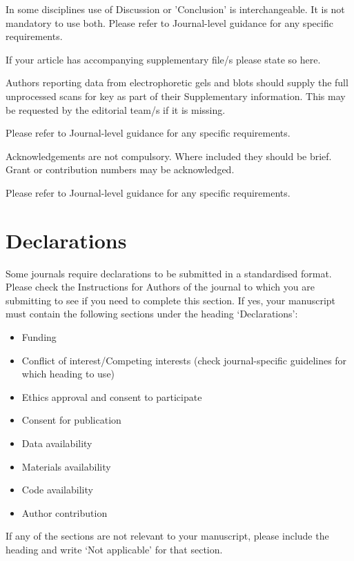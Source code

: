 \documentclass[pdflatex,sn-mathphys-num]{sn-jnl}%
\theoremstyle{thmstyleone}%
\theoremstyle{thmstyletwo}%
\theoremstyle{thmstylethree}%
\begin{document}
In some disciplines use of Discussion or 'Conclusion' is interchangeable. It is not mandatory to use both. Please refer to Journal-level guidance for any specific requirements. 

\backmatter


If your article has accompanying supplementary file/s please state so here. 

Authors reporting data from electrophoretic gels and blots should supply the full unprocessed scans for key as part of their Supplementary information. This may be requested by the editorial team/s if it is missing.

Please refer to Journal-level guidance for any specific requirements.



Acknowledgements are not compulsory. Where included they should be brief. Grant or contribution numbers may be acknowledged.

Please refer to Journal-level guidance for any specific requirements.

\section*{Declarations}

Some journals require declarations to be submitted in a standardised format. Please check the Instructions for Authors of the journal to which you are submitting to see if you need to complete this section. If yes, your manuscript must contain the following sections under the heading `Declarations':

\begin{itemize}
\item Funding
\item Conflict of interest/Competing interests (check journal-specific guidelines for which heading to use)
\item Ethics approval and consent to participate
\item Consent for publication
\item Data availability 
\item Materials availability
\item Code availability 
\item Author contribution
\end{itemize}

\noindent
If any of the sections are not relevant to your manuscript, please include the heading and write `Not applicable' for that section. 
\end{document}
